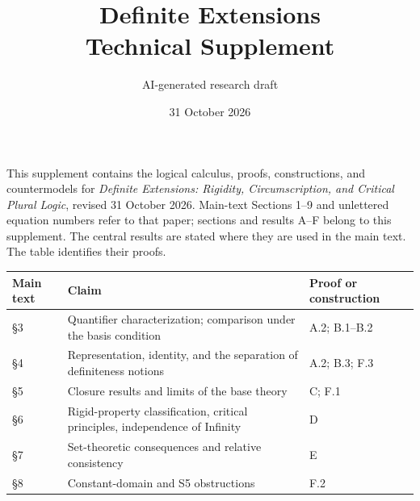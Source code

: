 \documentclass[11pt]{article}
\title{Definite Extensions\\[3pt]\large Technical Supplement}
\author{AI-generated research draft}
\date{31 October 2026}
\theoremstyle{definition}
\numberwithin{equation}{section}
\begin{document}
\maketitle
This supplement contains the logical calculus, proofs, constructions, and countermodels for \emph{Definite Extensions: Rigidity, Circumscription, and Critical Plural Logic}, revised 31 October 2026. Main-text Sections 1--9 and unlettered equation numbers refer to that paper; sections and results A--F belong to this supplement. The central results are stated where they are used in the main text. The table identifies their proofs.

\begin{center}\small
\begin{tabular}{@{}p{}p{}p{}@{}}
\toprule
Main text & Claim & Proof or construction\\
\midrule
\S3 & Quantifier characterization; comparison under the basis condition & A.2; B.1--B.2\\
\S4 & Representation, identity, and the separation of definiteness notions & A.2; B.3; F.3\\
\S5 & Closure results and limits of the base theory & C; F.1\\
\S6 & Rigid-property classification, critical principles, independence of Infinity & D\\
\S7 & Set-theoretic consequences and relative consistency & E\\
\S8 & Constant-domain and S5 obstructions & F.2\\
\bottomrule
\end{tabular}\end{center}
\end{document}
